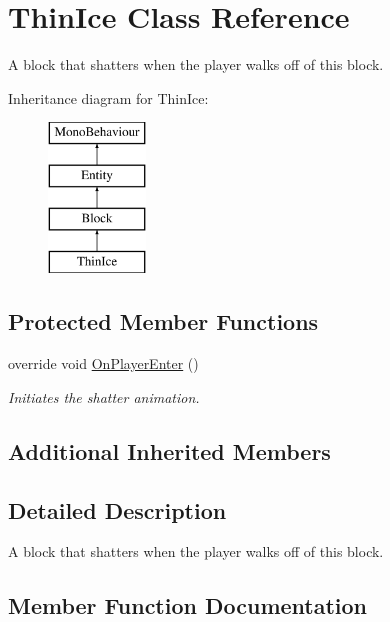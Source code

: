 \hypertarget{class_thin_ice}{}\section{Thin\+Ice Class Reference}
\label{class_thin_ice}


A block that shatters when the player walks off of this block.  


Inheritance diagram for Thin\+Ice\+:\begin{figure}[H]
\begin{center}
\leavevmode
\includegraphics[height=4.000000cm]{class_thin_ice}
\end{center}
\end{figure}
\subsection*{Protected Member Functions}
\begin{DoxyCompactItemize}
\item 
override void \mbox{\hyperlink{class_thin_ice_ab8e8cabf76700da05418fa3586b54f4c}{On\+Player\+Enter}} ()
\begin{DoxyCompactList}\small\item\em Initiates the shatter animation. \end{DoxyCompactList}\end{DoxyCompactItemize}
\subsection*{Additional Inherited Members}


\subsection{Detailed Description}
A block that shatters when the player walks off of this block. 



\subsection{Member Function Documentation}
\mbox{\label{class_thin_ice_ab8e8cabf76700da05418fa3586b54f4c}} 
